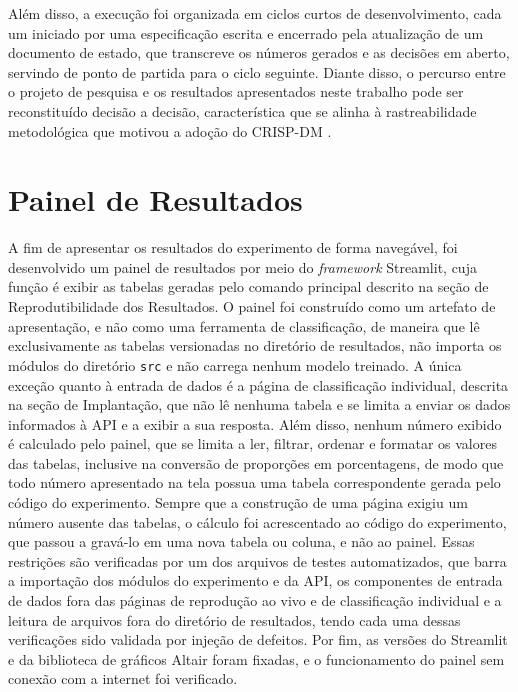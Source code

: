 Além disso, a execução foi organizada em ciclos curtos de desenvolvimento, cada um iniciado por uma especificação escrita e encerrado pela atualização de um documento de estado, que transcreve os números gerados e as decisões em aberto, servindo de ponto de partida para o ciclo seguinte. Diante disso, o percurso entre o projeto de pesquisa e os resultados apresentados neste trabalho pode ser reconstituído decisão a decisão, característica que se alinha à rastreabilidade metodológica que motivou a adoção do CRISP-DM \cite{wirth2000crisp}.

\section{Painel de Resultados}\label{sec:painel}
A fim de apresentar os resultados do experimento de forma navegável, foi desenvolvido um painel de resultados por meio do \textit{framework} Streamlit, cuja função é exibir as tabelas geradas pelo comando principal descrito na seção de Reprodutibilidade dos Resultados. O painel foi construído como um artefato de apresentação, e não como uma ferramenta de classificação, de maneira que lê exclusivamente as tabelas versionadas no diretório de resultados, não importa os módulos do diretório \texttt{src} e não carrega nenhum modelo treinado. A única exceção quanto à entrada de dados é a página de classificação individual, descrita na seção de Implantação, que não lê nenhuma tabela e se limita a enviar os dados informados à API e a exibir a sua resposta. Além disso, nenhum número exibido é calculado pelo painel, que se limita a ler, filtrar, ordenar e formatar os valores das tabelas, inclusive na conversão de proporções em porcentagens, de modo que todo número apresentado na tela possua uma tabela correspondente gerada pelo código do experimento. Sempre que a construção de uma página exigiu um número ausente das tabelas, o cálculo foi acrescentado ao código do experimento, que passou a gravá-lo em uma nova tabela ou coluna, e não ao painel. Essas restrições são verificadas por um dos arquivos de testes automatizados, que barra a importação dos módulos do experimento e da API, os componentes de entrada de dados fora das páginas de reprodução ao vivo e de classificação individual e a leitura de arquivos fora do diretório de resultados, tendo cada uma dessas verificações sido validada por injeção de defeitos. Por fim, as versões do Streamlit e da biblioteca de gráficos Altair foram fixadas, e o funcionamento do painel sem conexão com a internet foi verificado.

